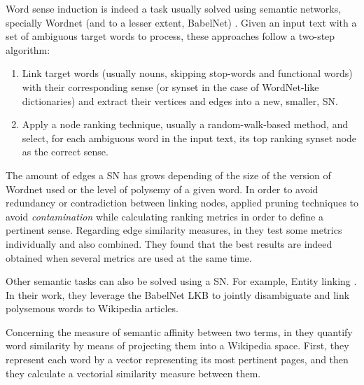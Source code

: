 Word sense induction is indeed a task usually solved using semantic networks, specially Wordnet (and to a lesser extent, BabelNet) \cite{2004.Mihalcea.SemanticNetworkPageRank,2007.Sinha.Mihalcea.Unsupervised,2007.Tsatsaronis.WSDwithSpreading,2007.Navigli.GraphConnectivity,2008.Agirre.Multilingual,2008.Klapaftis.WSIUsingCollocations,2009.Agirre.PersonalizedPageRankWSD,2010.Klapaftis.WSD.WSD.HierarchicalGraphs,2010.Siberer.GraphCooccurrenceWSD,2014.Moro.Navigli.EntityLinking_WSD}. Given an input text with a set of ambiguous target words to process, these approaches follow a two-step algorithm:
\begin{enumerate}
\item Link target words (usually nouns, skipping stop-words and functional words) with their corresponding  sense (or synset in the case of WordNet-like dictionaries) and extract their vertices and edges into a new, smaller, SN. 
\item Apply a node ranking technique, usually a random-walk-based method, and select, for each ambiguous word in the input text,  its top ranking synset node as the correct sense.
\end{enumerate}

The amount of edges a SN has grows depending of the size of the version of Wordnet used or the level of polysemy of a given word. In order to avoid redundancy or contradiction between  linking nodes, \cite{2004.Mihalcea.SemanticNetworkPageRank,2007.Navigli.GraphConnectivity} applied pruning techniques to avoid \textit{contamination} while calculating ranking metrics in order to define a pertinent sense. Regarding edge similarity measures,  in  \cite{2007.Sinha.Mihalcea.Unsupervised, 2007.Tsatsaronis.WSDwithSpreading} they test some metrics individually and also combined. They found that the best results are indeed obtained when several metrics are used at the same time.

Other semantic tasks can also be solved using a SN. For example, Entity linking \cite{2014.Moro.Navigli.EntityLinking_WSD}. In their work, they leverage the BabelNet LKB to jointly disambiguate and link polysemous words to Wikipedia articles. 

Concerning the measure of semantic affinity between two terms, in \cite{2009.Yeh.Wikiwalk} they quantify word similarity by means of projecting them into a Wikipedia space. First, they represent each word by a vector representing its most pertinent pages,  and then they calculate a vectorial similarity measure between them.

